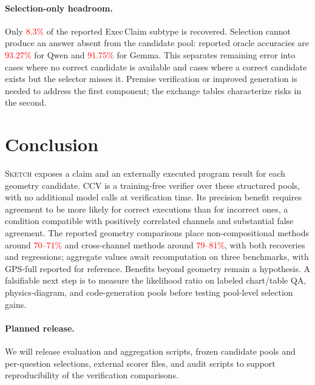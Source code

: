 \documentclass{article}
\newcommand{\sketch}{\textsc{Sketch}}
\newcommand{\ccv}{\textsc{CCV}}
\newcommand{\recheck}[1]{\textcolor{red}{#1}}
\begin{document}
\paragraph{Selection-only headroom.}
Only \recheck{8.3\%} of the reported Exec\,Claim subtype is recovered. Selection cannot produce an answer absent from the candidate pool: reported oracle accuracies are \recheck{93.27\%} for Qwen and \recheck{91.75\%} for Gemma. This separates remaining error into cases where no correct candidate is available and cases where a correct candidate exists but the selector misses it. Premise verification or improved generation is needed to address the first component; the exchange tables characterize risks in the second.

\section{Conclusion}

\sketch{} exposes a claim and an externally executed program result for each geometry candidate. \ccv{} is a training-free verifier over these structured pools, with no additional model calls at verification time. Its precision benefit requires agreement to be more likely for correct executions than for incorrect ones, a condition compatible with positively correlated channels and substantial false agreement. The reported geometry comparisons place non-compositional methods around \recheck{70--71\%} and cross-channel methods around \recheck{79--81\%}, with both recoveries and regressions; aggregate values await recomputation on three benchmarks, with GPS-full reported for reference. Benefits beyond geometry remain a hypothesis. A falsifiable next step is to measure the likelihood ratio on labeled chart/table QA, physics-diagram, and code-generation pools before testing pool-level selection gains.

\paragraph{Planned release.}
We will release evaluation and aggregation scripts, frozen candidate pools and per-question selections, external scorer files, and audit scripts to support reproducibility of the verification comparisons.

\end{document}
